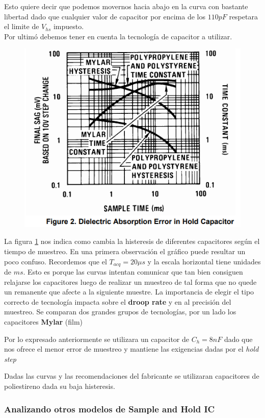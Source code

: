 Esto quiere decir que podemos movernos hacia abajo en la curva con bastante libertad dado que cualquier valor de capacitor por encima de los $110pF$ respetara el limite de $V_{hs}$ impuesto.\\
Por ultimó debemos tener en cuenta la tecnología de capacitor a utilizar.
\begin{figure}[H]
	\centering
	\includegraphics[scale=0.7]{ImagenesEjercicio4/AbsorcionDielectrico}
	\caption{}
	\label{fig:absorciondielectrico}
\end{figure}
La figura \ref{fig:absorciondielectrico} nos indica como cambia la histeresis de diferentes capacitores según el tiempo de muestreo. En una primera observación el gráfico puede resultar un poco confuso. Recordemos que el $T_{acq}=20\mu s$ y la escala horizontal tiene unidades de $ms$. Esto es porque las curvas intentan comunicar que tan bien consiguen relajarse los capacitores luego de realizar un muestreo de tal forma que no quede un remanente que afecte a la siguiente muestre.
La importancia de elegir el tipo correcto de tecnología impacta sobre el \textbf{droop rate} y en al precisión del muestreo. Se comparan dos grandes grupos de tecnologías, por un lado los capacitores \textbf{Mylar} (film)

Por lo expresado anteriormente se utilizara un capacitor de $C_h = 8nF$ dado que nos ofrece el menor error de muestreo y mantiene las exigencias dadas por el \textit{hold step}

Dadas las curvas y las recomendaciones del fabricante se utilizaran capacitores de poliestireno dada su baja histeresis.

\subsubsection{Analizando otros modelos de Sample and Hold IC}



%